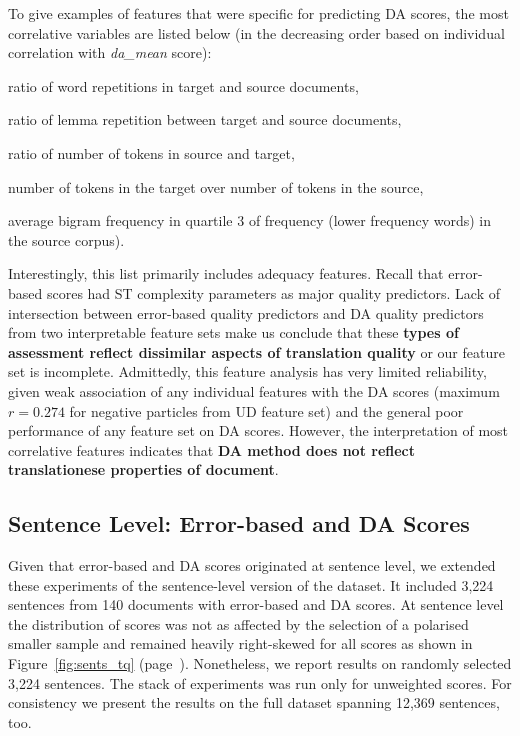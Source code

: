 To give examples of features that were specific for predicting DA scores, the most correlative variables are listed below (in the decreasing order based on individual correlation with \textit{da\_mean} score): 
\begin{description}\compresslist{}
	\item[9992] ratio of word repetitions in target and source documents,
	\item[9993] ratio of lemma repetition between target and source documents,
	\item[1003] ratio of number of tokens in source and target,
	\item[1004] number of tokens in the target over number of tokens in the source,
	\item[1052] average bigram frequency in quartile 3 of frequency (lower frequency words) in the source corpus).
\end{description}

Interestingly, this list primarily includes adequacy features. Recall that error-based scores had ST complexity parameters as major quality predictors. 
Lack of intersection between error-based quality predictors and DA quality predictors from two interpretable feature sets make us conclude that these \textbf{types of assessment reflect dissimilar aspects of translation quality} or our feature set is incomplete. 
Admittedly, this feature analysis has very limited reliability, given weak association of any individual features with the DA scores (maximum $r=0.274$ for negative particles from UD feature set) and the general poor performance of any feature set on DA scores. 
However, the interpretation of most correlative features indicates that \textbf{DA method does not reflect translationese properties of document}.

\subsection{\label{ssec:sent_level}Sentence Level: Error-based and DA Scores}
Given that error-based and DA scores originated at sentence level, we extended these experiments of the sentence-level version of the dataset. It included 3,224 sentences from 140 documents with error-based and DA scores. At sentence level the distribution of scores was not as affected by the selection of a polarised smaller sample and remained heavily right-skewed for all scores as shown in Figure~\ref{fig:sents_tq} (page~\pageref{fig:sents_tq}). Nonetheless, we report results on randomly selected 3,224 sentences. The stack of experiments was run only for unweighted scores. For consistency we present the results on the full dataset spanning 12,369 sentences, too.

